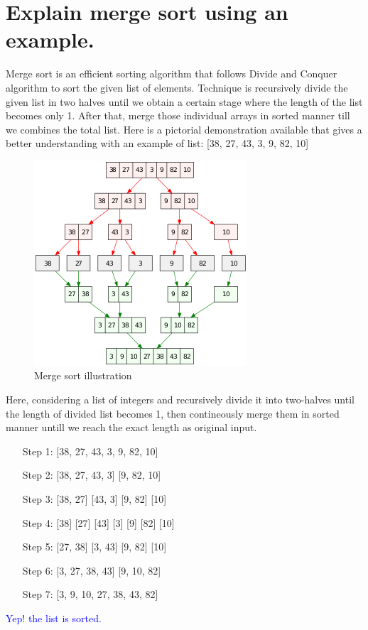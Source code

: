 \documentclass[11 pt]{article}
\begin{document}
\pagebreak

\section{Explain merge sort using an example.}
\justify
{
Merge sort is an efficient sorting algorithm that follows Divide and Conquer algorithm to sort the given list of elements. Technique is recursively divide the given list in two halves until we obtain a certain stage where the length of the list becomes only 1. After that, merge those individual arrays in sorted manner till we combines the total list. Here is a pictorial demonstration available that gives a better understanding with an example of list: [38, 27, 43, 3, 9, 82, 10]\\
}
\begin{figure}[h!]
\includegraphics[scale=0.7]{Pictures/300px-Merge_sort_algorithm_diagram.svg.png}
\centering
\caption{Merge sort illustration}
\end{figure}
Here, considering a list of integers and recursively divide it into two-halves until the length of divided list becomes 1, then contineously merge them in sorted manner untill we reach the exact length as original input.
\begin{enumerate}
	\item[Step 1:] [38, 27, 43, 3, 9, 82, 10]
	\item[Step 2:] [38, 27, 43, 3] [9, 82, 10]
	\item[Step 3:] [38, 27] [43, 3] [9, 82] [10]
	\item[Step 4:] [38] [27] [43] [3] [9] [82] [10]
	\item[Step 5:] [27, 38] [3, 43] [9, 82] [10]
	\item[Step 6:] [3, 27, 38, 43] [9, 10, 82]
	\item[Step 7:] [3, 9, 10, 27, 38, 43, 82]
\end{enumerate}
\textcolor{blue}{Yep! the list is sorted.}
\end{document}
